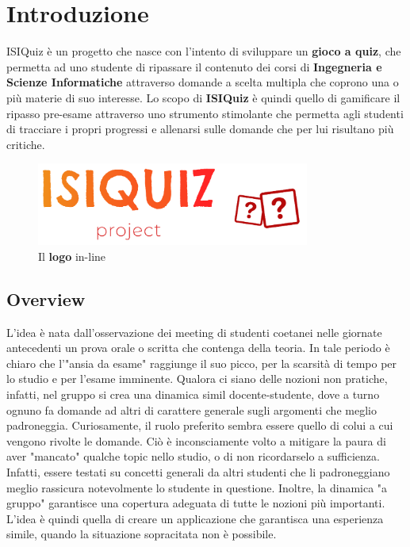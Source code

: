 

\chapter{Introduzione}
ISIQuiz è un progetto che nasce con l'intento di sviluppare un \textbf{gioco a quiz}, che permetta ad uno studente di ripassare il contenuto dei corsi di \textbf{Ingegneria e Scienze Informatiche} attraverso domande a scelta multipla che coprono una o più materie di suo interesse. Lo scopo di \textbf{ISIQuiz} è quindi quello di gamificare il ripasso pre-esame attraverso uno strumento stimolante che permetta agli studenti di tracciare i propri progressi e allenarsi sulle domande che per lui risultano più critiche.
\begin{figure}[H]
    \caption{Il \textbf{logo} in-line}
    \label{fig:Logo}
    \centering
    \includegraphics[width=0.8\textwidth]{Extra/ISIQuizLogoLineTransparent.png}
\end{figure}

\section{Overview}
L'idea è nata dall'osservazione dei meeting di studenti coetanei nelle giornate antecedenti un prova orale o scritta che contenga della teoria. In tale periodo è chiaro che l'"ansia da esame" raggiunge il suo picco, per la scarsità di tempo per lo studio e per l'esame imminente. Qualora ci siano delle nozioni non pratiche, infatti, nel gruppo si crea una dinamica simil docente-studente, dove a turno ognuno fa domande ad altri di carattere generale sugli argomenti che meglio padroneggia. Curiosamente, il ruolo preferito sembra essere quello di colui a cui vengono rivolte le domande. Ciò è inconsciamente volto a mitigare la paura di aver "mancato" qualche topic nello studio, o di non ricordarselo a sufficienza. Infatti, essere testati su concetti generali da altri studenti che li padroneggiano meglio rassicura notevolmente lo studente in questione. Inoltre, la dinamica "a gruppo" garantisce una copertura adeguata di tutte le nozioni più importanti. L'idea è quindi quella di creare un applicazione che garantisca una esperienza simile, quando la situazione sopracitata non è possibile. 


